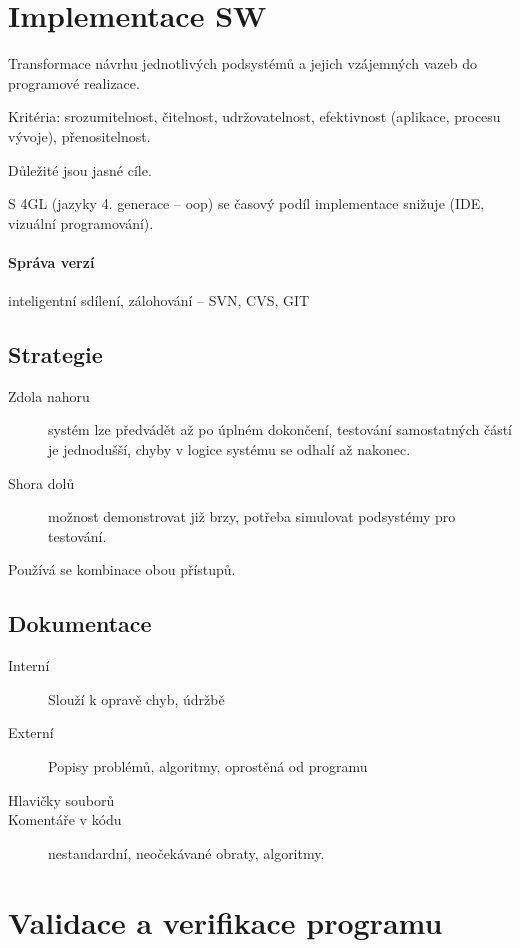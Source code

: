 \documentclass[a4paper, 11pt]{report}
\begin{document}
\section{Implementace SW}

Transformace návrhu jednotlivých podsystémů a jejich vzájemných vazeb do programové realizace.

Kritéria: srozumitelnost, čitelnost, udržovatelnost, efektivnost (aplikace, procesu vývoje), přenositelnost.

Důležité jsou jasné cíle.

S 4GL (jazyky 4. generace -- oop) se časový podíl implementace snižuje (IDE, vizuální programování).

\paragraph{Správa verzí} inteligentní sdílení, zálohování -- SVN, CVS, GIT

\subsection{Strategie}
\begin{description}
	\item[Zdola nahoru] systém lze předvádět až po úplném dokončení, testování samostatných částí je jednodušší, chyby v logice systému se odhalí až nakonec.
	\item[Shora dolů] možnost demonstrovat již brzy, potřeba simulovat podsystémy pro testování.
\end{description}
Používá se kombinace obou přístupů.

\subsection{Dokumentace}
\begin{description}
	\item[Interní] Slouží k opravě chyb, údržbě
	\item[Externí] Popisy problémů, algoritmy, oprostěná od programu
	\item[Hlavičky souborů]
	\item[Komentáře v kódu] nestandardní, neočekávané obraty, algoritmy.
\end{description}

\section{Validace a verifikace programu}
\end{document}
